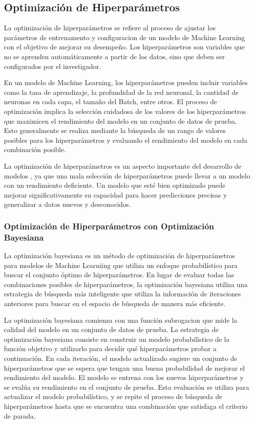 \subsection{Optimización de Hiperparámetros}
La optimización de hiperparámetros se refiere al proceso de ajustar los parámetros 
de entrenamento y configuracion de un modelo de Machine Learning con el objetivo de 
mejorar su desempeño. Los hiperparámetros son variables que no se aprenden automáticamente 
a partir de los datos, sino que deben ser configurados por el investigador.\medskip

En un modelo de Machine Learning, los hiperparámetros pueden incluir variables como 
la tasa de aprendizaje, la profundidad de la red neuronal, la cantidad de neuronas en 
cada capa, el tamaño del Batch, entre otros. El proceso de optimización implica la 
selección cuidadosa de los valores de los hiperparámetros que maximicen el rendimiento 
del modelo en un conjunto de datos de prueba. Esto generalmente se realiza mediante 
la búsqueda de un rango de valores posibles para los hiperparámetros y evaluando el 
rendimiento del modelo en cada combinación posible.\medskip

La optimización de hiperparámetros es un aspecto importante del desarrollo de modelos 
, ya que una mala selección de hiperparámetros puede llevar a un modelo con un rendimiento 
deficiente. Un modelo que esté bien optimizado puede mejorar significativamente su 
capacidad para hacer predicciones precisas y generalizar a datos nuevos y desconocidos.

\subsubsection{Optimización de Hiperparámetros con Optimización Bayesiana}
La optimización bayesiana es un método de optimización de hiperparámetros para modelos 
de Machine Learniing que utiliza un enfoque probabilístico para buscar el conjunto 
óptimo de hiperparámetros. En lugar de evaluar todas las combinaciones posibles de 
hiperparámetros, la optimización bayesiana utiliza una estrategia de búsqueda más 
inteligente que utiliza la información de iteraciones anteriores para buscar en el 
espacio de búsqueda de manera más eficiente.\medskip

La optimización bayesiana comienza con una función subrogacion que mide la calidad del modelo 
en un conjunto de datos de prueba. La estrategia de optimización bayesiana consiste en construir 
un modelo probabilístico de la función objetivo y utilizarlo para decidir qué hiperparámetros 
probar a continuación. En cada iteración, el modelo actualizado sugiere un conjunto de 
hiperparámetros que se espera que tengan una buena probabilidad de mejorar el rendimiento 
del modelo. El modelo se entrena con los nuevos hiperparámetros y se evalúa 
su rendimiento en el conjunto de prueba. Esta evaluación se utiliza para actualizar el 
modelo probabilístico, y se repite el proceso de búsqueda de hiperparámetros hasta 
que se encuentra una combinación que satisfaga el criterio de parada.

